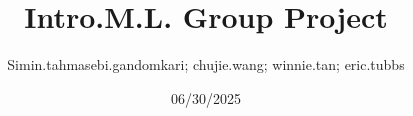 \title{Intro.M.L. Group Project}
\author{Simin.tahmasebi.gandomkari; chujie.wang; winnie.tan; eric.tubbs}
\date{06/30/2025}
%
